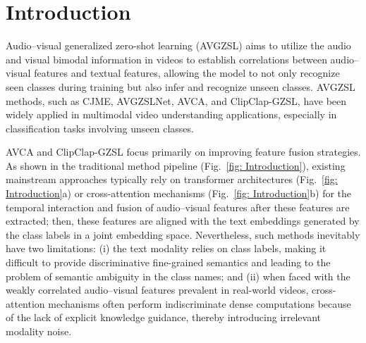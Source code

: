\documentclass[lettersize,journal]{IEEEtran}
\begin{document}
\section{Introduction}
Audio–visual generalized zero-shot learning (AVGZSL) aims to utilize the audio and visual bimodal information in videos to establish correlations between audio–visual features and textual features, allowing the model to not only recognize seen classes during training but also infer and recognize unseen classes. AVGZSL methods, such as CJME\cite{3}, AVGZSLNet\cite{4}, AVCA\cite{1}, and ClipClap-GZSL\cite{2}, have been widely applied in multimodal video understanding applications, especially in classification tasks involving unseen classes.


AVCA and ClipClap-GZSL focus primarily on improving feature fusion strategies. As shown in the traditional method pipeline (Fig.~\ref{fig: Introduction}), existing mainstream approaches typically rely on transformer architectures (Fig.~\ref{fig: Introduction}a) or cross-attention mechanisms (Fig.~\ref{fig: Introduction}b) for the temporal interaction and fusion of audio–visual features after these features are extracted; then, these features are aligned with the text embeddings generated by the class labels in a joint embedding space. Nevertheless, such methods inevitably have two limitations: (i) the text modality relies on class labels, making it difficult to provide discriminative fine-grained semantics and leading to the problem of semantic ambiguity in the class names; and (ii) when faced with the weakly correlated audio–visual features prevalent in real-world videos, cross-attention mechanisms often perform indiscriminate dense computations because of the lack of explicit knowledge guidance, thereby introducing irrelevant modality noise.
\end{document}
